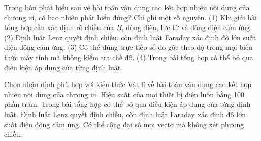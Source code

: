 \begin{ex}
Trong bốn phát biểu sau về bài toán vận dụng cao kết hợp nhiều nội dung của chương iii, có bao nhiêu phát biểu đúng? Chỉ ghi một số nguyên. (1) Khi giải bài tổng hợp cần xác định rõ chiều của $B$, dòng điện, lực từ và dòng điện cảm ứng. (2) Định luật Lenz quyết định chiều, còn định luật Faraday xác định độ lớn suất điện động cảm ứng. (3) Có thể dùng trực tiếp số đo góc theo độ trong mọi biểu thức máy tính mà không kiểm tra chế độ. (4) Trong bài tổng hợp có thể bỏ qua điều kiện áp dụng của từng định luật.
\end{ex}

\begin{ex}
Chọn nhận định phù hợp với kiến thức Vật lí về bài toán vận dụng cao kết hợp nhiều nội dung của chương iii.
\choice
{Hiệu suất của mọi thiết bị điện luôn bằng 100 phần trăm.}
{Trong bài tổng hợp có thể bỏ qua điều kiện áp dụng của từng định luật.}
{\True Định luật Lenz quyết định chiều, còn định luật Faraday xác định độ lớn suất điện động cảm ứng.}
{Có thể cộng đại số mọi vectơ mà không xét phương chiều.}
\end{ex}

